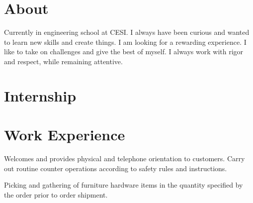 \documentclass[a4paper,table]{twentysecondcv}
\begin{document}
\section{About}

Currently in engineering school at CESI. I always have been curious and wanted to learn new skills and create things. I am looking for a rewarding experience. I like to take on challenges and give the best of myself. I always work with rigor and respect, while remaining attentive.

\section{Internship}

\begin{twenty}


\end{twenty}

\vspace{-0.4cm}

\section{Work Experience}

\begin{twenty}

{Welcomes and provides physical and telephone orientation to customers. Carry out routine counter operations according to safety rules and instructions.}

{Picking and gathering of furniture hardware items in the quantity specified by the order prior to order shipment.}

\end{twenty}

\vspace{-0.4cm}
\end{document}
